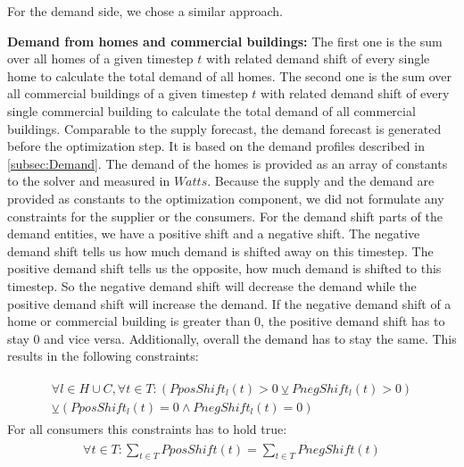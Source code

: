 For the demand side, we chose a similar approach.

\textbf{Demand from homes and commercial buildings:} The first one is the sum over all homes of a given timestep $t$ with related demand shift of every single home to calculate the total demand of all homes.
The second one is the sum over all commercial buildings of a given timestep $t$ with related demand shift of every single commercial building to calculate the total demand of all commercial buildings.
Comparable to the supply forecast, the demand forecast is generated before the optimization step. 
It is based on the demand profiles described in \cref{subsec:Demand}. 
The demand of the homes is provided as an array of constants to the solver and measured in $Watts$. 
Because the supply and the demand are provided as constants to the optimization component, we did not formulate any constraints for the supplier or the consumers.
For the demand shift parts of the demand entities, we have a positive shift and a negative shift.
The negative demand shift tells us how much demand is shifted away on this timestep.
The positive demand shift tells us the opposite, how much demand is shifted to this timestep.
So the negative demand shift will decrease the demand while the positive demand shift will increase the demand.
If the negative demand shift of a home or commercial building is greater than 0, the positive demand shift has to stay 0 and vice versa. Additionally, overall the demand has to stay the same. 
This results in the following constraints:

\begin{align} \label{eq:shift}
\begin{split}
\forall l \in H\cup C, \forall t \in T: (PposShift_{l}(t) > 0 \veebar PnegShift_{l}(t) > 0)\\ \veebar (PposShift_{l}(t) = 0 \wedge PnegShift_{l}(t) = 0)
\end{split}
\end{align}
For all consumers this constraints has to hold true:
\begin{align} \label{eq:shiftSum}
\begin{split}
\forall t \in T: \sum\limits_{t\in T} PposShift(t) = \sum\limits_{t\in T} PnegShift(t)\\
\end{split}
\end{align}

